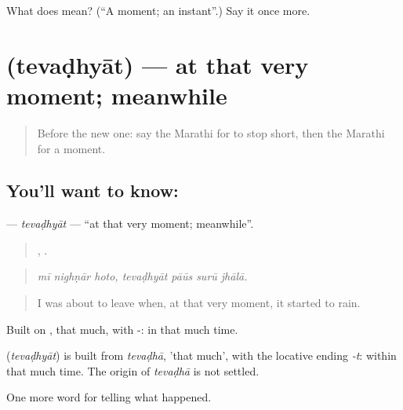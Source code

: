 \begin{tcolorbox}[breakable,colback=teal!4,colframe=teal!35!black,title={Before you move on}]
What does  mean? (\textquotedblleft{}A moment; an instant\textquotedblright{}.) Say it once more.
\end{tcolorbox}
\section[\texorpdfstring{\mr{तेवढ्यात} (tevaḍhyāt)}{तेवढ्यात (tevaḍhyāt)}]{ (tevaḍhyāt) — at that very moment; meanwhile}

\label{lesson:MR-C302-tevadhyat}



\begin{quote}
Before the new one: say the Marathi for to stop short, then the Marathi for a moment.
\end{quote}

\subsection*{You'll want to know: }
\textbf{} — \emph{tevaḍhyāt} — \textquotedblleft{}at that very moment; meanwhile\textquotedblright{}.

\begin{quote}
  ,    .
\end{quote}

\begin{quote}
\emph{mī nighṇār hoto, tevaḍhyāt pāūs surū jhālā.}
\end{quote}

\begin{quote}
I was about to leave when, at that very moment, it started to rain.
\end{quote}

Built on , that much, with -: in that much time.

\begin{cousinweb}
\textbf{} (\emph{tevaḍhyāt}) is built from \emph{tevaḍhā}, 'that much', with the locative ending \emph{-t}: within that much time. The origin of \emph{tevaḍhā} is not settled.
\end{cousinweb}

\begin{grammarlens}[title={What you've built}]
One more word for telling what happened.
\end{grammarlens}

